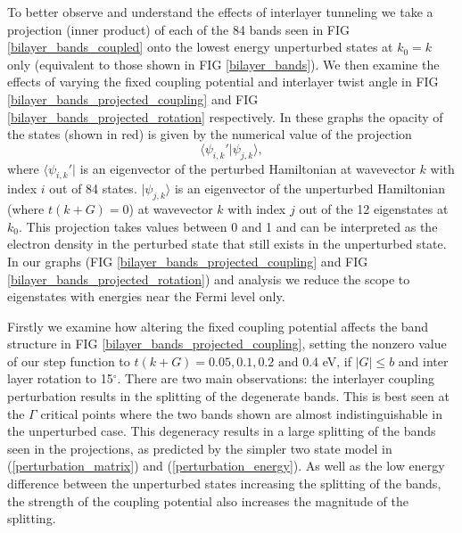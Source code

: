\documentclass[12pt]{report} %
\begin{document}
To better observe and understand the effects of interlayer tunneling we take a projection (inner product) of each of the 84 bands seen in FIG \ref{bilayer_bands_coupled} onto the lowest energy unperturbed states at $k_0 = k$ only (equivalent to those shown in FIG \ref{bilayer_bands}). We then examine the effects of varying the fixed coupling potential and interlayer twist angle in FIG \ref{bilayer_bands_projected_coupling} and FIG \ref{bilayer_bands_projected_rotation} respectively. In these graphs the opacity of the states (shown in red) is given by the numerical value of the projection
%
\begin{equation}
  \langle \psi_{i, k}'|\psi_{j, k} \rangle,
\end{equation}
%
where $\langle \psi_{i, k}'|$ is an eigenvector of the perturbed Hamiltonian at wavevector $k$ with index $i$ out of 84 states. $|\psi_{j, k} \rangle$ is an eigenvector of the unperturbed Hamiltonian (where $t(k+G)=0$) at wavevector $k$ with index $j$ out of the 12 eigenstates at $k_0$. This projection takes values between 0 and 1 and can be interpreted as the electron density in the perturbed state that still exists in the unperturbed state. In our graphs (FIG \ref{bilayer_bands_projected_coupling} and FIG \ref{bilayer_bands_projected_rotation}) and analysis we reduce the scope to eigenstates with energies near the Fermi level only.

Firstly we examine how altering the fixed coupling potential affects the band structure in FIG \ref{bilayer_bands_projected_coupling}, setting the nonzero value of our step function to $t(k+G) = 0.05, 0.1, 0.2 \text{ and } 0.4$ eV, if  $|G|\leq b$ and inter layer rotation to 15$^\circ$. There are two main observations: the interlayer coupling perturbation results in the splitting of the degenerate bands. This is best seen at the $\Gamma$ critical points where the two bands shown are almost indistinguishable in the unperturbed case. This degeneracy results in a large splitting of the bands seen in the projections, as predicted by the simpler two state model in (\ref{perturbation_matrix}) and (\ref{perturbation_energy}). As well as the low energy difference between the unperturbed states increasing the splitting of the bands, the strength of the coupling potential also increases the magnitude of the splitting.
\end{document}

